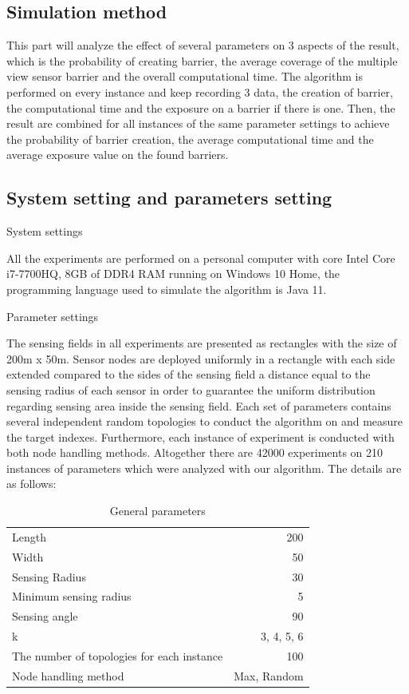 
\subsection{Simulation method}

This part will analyze the effect of several parameters on 3 aspects of the result, which is the probability of creating barrier, the average coverage of the multiple view sensor barrier and the overall computational time. The algorithm is performed on every instance and keep recording 3 data, the creation of barrier, the computational time and the exposure on a barrier if there is one. Then, the result are combined for all instances of the same parameter settings to achieve the probability of barrier creation, the average computational time and the average exposure value on the found barriers.

\subsection{System setting and parameters setting}
System settings

All the experiments are performed on a personal computer with core Intel Core i7-7700HQ, 8GB of DDR4 RAM running on Windows 10 Home, the programming language used to simulate the algorithm is Java 11.

Parameter settings

The sensing fields in all experiments are presented as rectangles with the size of 200m x 50m. Sensor nodes are deployed uniformly in a rectangle with each side extended compared to the sides of the sensing field a distance equal to the sensing radius of each sensor in order to guarantee the uniform distribution regarding sensing area inside the sensing field. Each set of parameters contains several independent random topologies to conduct the algorithm on and measure the target indexes. Furthermore, each instance of experiment is conducted with both node handling methods. Altogether there are 42000 experiments on 210 instances of parameters which were analyzed with our algorithm. The details are as follows:
\begin{table}[h!]
	\centering
	\begin{tabular}{l | r}
		Length & 200 \\
		Width & 50 \\
		Sensing Radius & 30 \\
		Minimum sensing radius & 5 \\
		Sensing angle & 90 \\
		k & 3, 4, 5, 6 \\
		The number of topologies for each instance & 100 \\
		Node handling method & Max, Random
		
	\end{tabular}
	\caption{General parameters}
\end{table}

